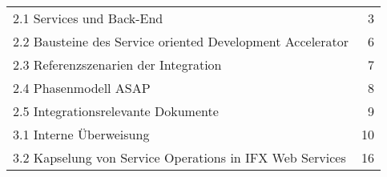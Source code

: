 \begin{tabularx}{\textwidth}{X r}
    2.1 Services und Back-End & 3\\
    2.2 Bausteine des Service oriented Development Accelerator & 6\\
    2.3 Referenzszenarien der Integration & 7\\
    2.4 Phasenmodell ASAP & 8\\
    2.5 Integrationsrelevante Dokumente & 9\\
    3.1 Interne Überweisung & 10\\
    3.2 Kapselung von Service Operations in IFX Web Services & 16\\
\end{tabularx} 